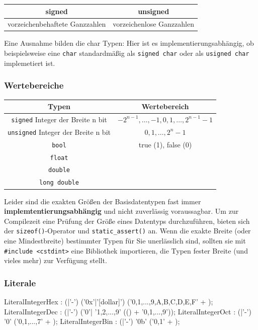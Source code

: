 \documentclass[a4paper]{report}
\begin{document}
\begin{center}
\begin{tabular}{c|c}
	\textbf{signed} & \textbf{unsigned} \\ \hline
	vorzeichenbehaftete Ganzzahlen & vorzeichenlose Ganzzahlen
\end{tabular}
\end{center}
 
Eine Ausnahme bilden die char Typen: Hier ist es implementierungsabhängig, ob beispielsweise eine \texttt{char} standardmäßig als \texttt{signed char} oder als \texttt{usigned char} implemetiert ist.

\subsubsection{Wertebereiche}

\begin{center}
\begin{tabular}{|c|c|}
	\hline
	\textbf{Typen}	& \textbf{Wertebereich} \\ \hline
	\texttt{signed} Integer der Breite n bit & $-2^{n-1}, \dots , -1,0,1, \dots ,2^{n-1}-1$ \\ 
	\texttt{unsigned} Integer der Breite n bit & $0,1, \dots ,2^{n}-1$ \\\hline
	\texttt{bool} & true (1), false (0) \\ \hline
	\texttt{float} &\\%
	\texttt{double} &\\
	\texttt{long double} & \\ \hline
	
\end{tabular}
\end{center}

Leider sind die exakten Größen der Basisdatentypen fast immer \textbf{implemtentierungsabhängig} und nicht zuverlässig voraussagbar. Um zur Compilezeit eine Prüfung der Größe eines Datentyps durchzuführen, bieten sich der \texttt{sizeof()}-Operator und \texttt{static\_assert()} an. Wenn die exakte Breite (oder eine Mindestbreite) bestimmter Typen für Sie unerlässlich sind, sollten sie mit \texttt{\#include <cstdint>} eine Bibliothek importieren, die Typen fester Breite (und vieles mehr) zur Verfügung stellt.


\subsubsection{Literale}
\begin{rail}
	LiteralIntegerHex : (|'-') ('0x'|'[dollar]') ('0,1,...,9,A,B,C,D,E,F' +  );
	LiteralIntegerDec : (|'-') ('0'| '1,2,...,9' (() + '0,1,...,9'));
	LiteralIntegerOct : (|'-') '0' ('0,1,...,7' +  );
	LiteralIntegerBin : (|'-') '0b' ('0,1' +  );
\end{rail}
\end{document}
